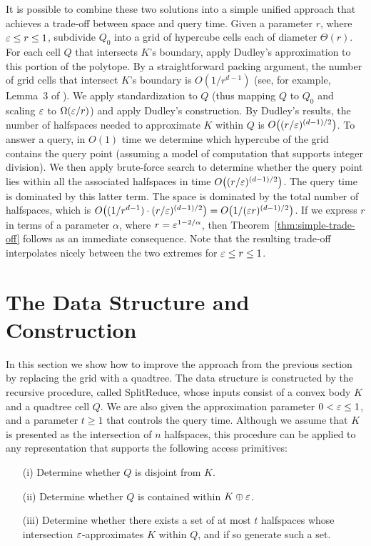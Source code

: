 \documentclass[11pt]{article}   \usepackage[letterpaper,hmargin=2.1cm,vmargin=3cm]{geometry}
\newcommand{\alg}{\textrm{SplitReduce}}
\begin{document}
It is possible to combine these two solutions into a simple unified approach that achieves a trade-off between space and query time. Given a parameter $r$, where $\varepsilon \le r \le 1$, subdivide $Q_0$ into a grid of hypercube cells each of diameter $\Theta(r)$. For each cell $Q$ that intersects $K$'s boundary, apply Dudley's approximation to this portion of the polytope. By a straightforward packing argument, the number of grid cells that intersect $K$'s boundary is $O(1/r^{d-1})$ (see, for example, Lemma~{3} of \cite{ARS}). We apply standardization to $Q$ (thus mapping $Q$ to $Q_0$ and scaling $\varepsilon$ to $\Omega(\varepsilon/r)$) and apply Dudley's construction. By Dudley's results, the number of halfspaces needed to approximate $K$ within $Q$ is $O\big((r/\varepsilon)^{(d-1)/2}\big)$. To answer a query, in $O(1)$ time we determine which hypercube of the grid contains the query point (assuming a model of computation that supports integer division). We then apply brute-force search to determine whether the query point lies within all the associated halfspaces in time $O\big((r/\varepsilon)^{(d-1)/2}\big)$. The query time is dominated by this latter term. The space is dominated by the total number of halfspaces, which is $O\big((1/r^{d-1}) \cdot (r/\varepsilon)^{(d-1)/2}\big) = O\big(1/(\varepsilon r)^{(d-1)/2}\big)$. If we express $r$ in terms of a parameter $\alpha$, where $r = \varepsilon^{1 - 2/\alpha}$, then Theorem~\ref{thm:simple-trade-off} follows as an immediate consequence. Note that the resulting trade-off interpolates nicely between the two extremes for $\varepsilon \le r \le 1$.

\section{The Data Structure and Construction} \label{sec:split-reduce}


In this section we show how to improve the approach from the previous section by replacing the grid with a quadtree. The data structure is constructed by the recursive procedure, called {\alg}, whose inputs consist of a convex body $K$ and a quadtree cell $Q$. We are also given the approximation parameter $0 < \varepsilon \le 1$, and a parameter $t \ge 1$ that controls the query time. Although we assume that $K$ is presented as the intersection of $n$ halfspaces, this procedure can be applied to any representation that supports the following access primitives:
\begin{enumerate}
\item[(i)] Determine whether $Q$ is disjoint from $K$.

\item[(ii)] Determine whether $Q$ is contained within $K \oplus \varepsilon$.

\item[(iii)] Determine whether there exists a set of at most $t$ halfspaces whose intersection $\varepsilon$-approximates $K$ within $Q$, and if so generate such a set.
\end{enumerate}
\end{document}
